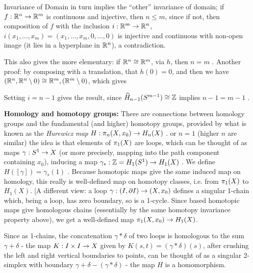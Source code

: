 \bsk

Invariance of Domain in turn implies the ``other'' invariance of domain; if 
$f: {\Bbb R}^n\rightarrow {\Bbb R}^m$ is continuous and injective, then
$n\leq m$, since if not, then composition of $f$ with the inclusion 
$i:{\Bbb R}^m\rightarrow {\Bbb R}^n$, $i(x_1,\ldots ,x_m) = 
(x_1,\ldots ,x_m,0,\ldots ,0)$ is injective and continuous with non-open 
image (it lies in a hyperplane in ${\Bbb R}^n$),
a contradiction.

\msk

This also gives the more elementary: if ${\Bbb R}^n\cong {\Bbb R}^m$, via $h$, then $n=m$ .
Another proof: by composing with a translation, that $h(0)=0$, and then we have 
$({\Bbb R}^n,{\Bbb R}^n\setminus 0)\cong {\Bbb R}^m,({\Bbb R}^m\setminus 0)$, which gives


\ssk



\ssk

Setting $i=n-1$ gives the result, since $\widetilde{H}_{n-1}(S^{m-1})\cong {\Bbb Z}$ implies $n-1=m-1$ .

\msk

{\bf Homology and homotopy groups:} There are connections between homology groups and
the fundamental (and higher) homotopy groups, provided by what is known as the
{\it Hurewicz map} $H:\pi_n(X,x_0)\rightarrow H_n(X)$ . or $n=1$ (higher $n$ are similar)
the idea is that elements of $\pi_1(X)$ are loops, which can be thought of as maps
$\gamma:S^1\rightarrow X$ (or more precisely, mapping into the path component containing 
$x_0$), inducing a map $\gamma_*:{\Bbb Z} = H_1(S^1)\rightarrow H_1(X)$ . 
We define $H([\gamma])=\gamma_*(1)$ . Because homotopic maps give the same induced
map on homology, this really is well-defined map on homotopy
classes, i.e. from $\pi_1(X)$ to $H_1(X)$. [A different view: 
a loop $\gamma:(I,\partial I)\rightarrow (X,x_0)$ defines a singular 1-chain which, being a loop,
has zero boundary, so is a 1-cycle. Since based homotopic maps give homologous
chains (essentially by the same homotopy invariance property above), we get a 
well-defined map $\pi_1(X,x_0)\rightarrow H_1(X)$.

Since as 1-chains, the concatenation $\gamma*\delta$ of two loops is homologous
to the sum $\gamma+\delta$ - the map $K:I\times I\rightarrow X$ given by $K(s,t)=(\gamma*\delta)(s)$,
after crushing the left and right vertical boundaries to points, can be thought of as
a singular 2-simplex with boundary $\gamma + \delta - (\gamma*\delta)$ - the map 
$H$ is a homomorphism.

